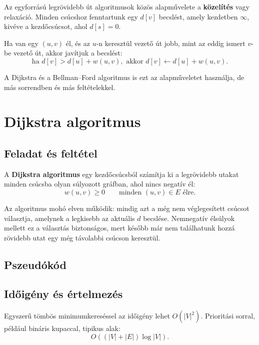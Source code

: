 Az egyforrású legrövidebb út algoritmusok közös alapművelete a \textbf{közelítés} vagy relaxáció. Minden csúcshoz fenntartunk egy $d[v]$ becslést, amely kezdetben $\infty$, kivéve a kezdőcsúcsot, ahol $d[s]=0$.

Ha van egy $(u,v)$ él, és az $u$-n keresztül vezető út jobb, mint az eddig ismert $v$-be vezető út, akkor javítjuk a becslést:
\[
\text{ha }d[v]>d[u]+w(u,v),\text{ akkor }d[v]\leftarrow d[u]+w(u,v).
\]




A Dijkstra és a Bellman--Ford algoritmus is ezt az alapműveletet használja, de más sorrendben és más feltételekkel.

\section{Dijkstra algoritmus}

\subsection{Feladat és feltétel}

A \textbf{Dijkstra algoritmus} egy kezdőcsúcsból számítja ki a legrövidebb utakat minden csúcsba olyan súlyozott gráfban, ahol nincs negatív él:
\[
w(u,v)\geq 0\qquad \text{minden }(u,v)\in E\text{ élre.}
\]

Az algoritmus mohó elven működik: mindig azt a még nem véglegesített csúcsot választja, amelynek a legkisebb az aktuális $d$ becslése. Nemnegatív élsúlyok mellett ez a választás biztonságos, mert később már nem találhatunk hozzá rövidebb utat egy még távolabbi csúcson keresztül.

\subsection{Pszeudókód}


\subsection{Időigény és értelmezés}

Egyszerű tömbös minimumkereséssel az időigény lehet $O(|V|^2)$. Prioritási sorral, például bináris kupaccal, tipikus alak:
\[
O((|V|+|E|)\log |V|).
\]

